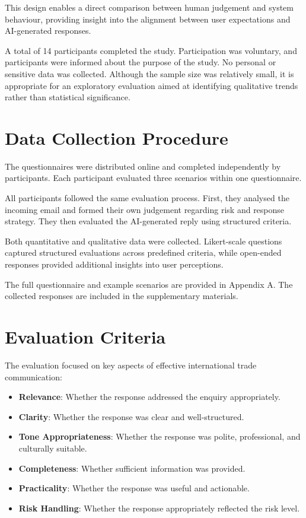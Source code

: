 \documentclass[12pt,a4paper]{report}
\begin{document}
This design enables a direct comparison between human judgement and system behaviour, providing insight into the alignment between user expectations and AI-generated responses.

A total of 14 participants completed the study. Participation was voluntary, and participants were informed about the purpose of the study. No personal or sensitive data was collected. Although the sample size was relatively small, it is appropriate for an exploratory evaluation aimed at identifying qualitative trends rather than statistical significance.

\section{Data Collection Procedure}

The questionnaires were distributed online and completed independently by participants. Each participant evaluated three scenarios within one questionnaire.

All participants followed the same evaluation process. First, they analysed the incoming email and formed their own judgement regarding risk and response strategy. They then evaluated the AI-generated reply using structured criteria.

Both quantitative and qualitative data were collected. Likert-scale questions captured structured evaluations across predefined criteria, while open-ended responses provided additional insights into user perceptions.

The full questionnaire and example scenarios are provided in Appendix A. The collected responses are included in the supplementary materials.

\section{Evaluation Criteria}

The evaluation focused on key aspects of effective international trade communication:

\begin{itemize}
    \item \textbf{Relevance}: Whether the response addressed the enquiry appropriately.
    
    \item \textbf{Clarity}: Whether the response was clear and well-structured.
    
    \item \textbf{Tone Appropriateness}: Whether the response was polite, professional, and culturally suitable.
    
    \item \textbf{Completeness}: Whether sufficient information was provided.
    
    \item \textbf{Practicality}: Whether the response was useful and actionable.
    
    \item \textbf{Risk Handling}: Whether the response appropriately reflected the risk level.
\end{itemize}
\end{document}
